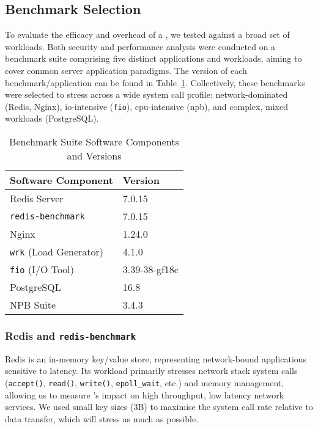 \subsection{Benchmark Selection}\label{subsec:benchmark-selection}

To evaluate the efficacy and overhead of a \af, we tested against a broad set
of workloads. Both security and performance analysis were conducted on a 
benchmark suite comprising five distinct applications and workloads,
aiming to cover common server application paradigms. The version of each
benchmark/application can be found in 
Table~\ref{tab:benchmark_software_versions}. Collectively, these benchmarks were
selected to stress \af across a wide system call profile: network-dominated 
(Redis, Nginx), \ac{io}-intensive (\texttt{fio}), \ac{cpu}-intensive 
(\ac{npb}), and complex, mixed workloads (PostgreSQL).

\begin{table}[h] 
    \centering 
    \caption{Benchmark Suite Software Components and Versions}
    \label{tab:benchmark_software_versions}
    \begin{tabular}{@{}ll@{}} %
        \toprule
        Software Component    & Version \\
        \midrule
        Redis Server          & 7.0.15 \\
        \texttt{redis-benchmark} & 7.0.15 \\
        Nginx                 & 1.24.0 \\
        \texttt{wrk} (Load Generator) & 4.1.0 \\ %
        \texttt{fio} (I/O Tool) & 3.39-38-gf18c \\ %
        PostgreSQL            & 16.8 \\
        NPB Suite             & 3.4.3 \\ %
        \bottomrule
    \end{tabular}
\end{table}

\subsubsection{Redis and \texttt{redis-benchmark}}\label{subsubsec:redis-just}

Redis is an in-memory key/value store, representing network-bound applications 
sensitive to latency. Its workload primarily stresses network stack system calls 
(\texttt{accept()}, \texttt{read()}, \texttt{write()}, \texttt{epoll\_wait}, 
etc.) and memory management, allowing us to  measure  \af's impact on high 
throughput, low latency network services. We used small key sizes (3B) to 
maximise the system call rate relative to data transfer, which will stress \af as 
much as possible.

